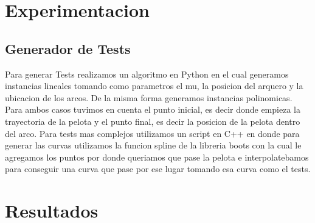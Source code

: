 \section{Experimentacion}
\subsection{Generador de Tests}
Para generar Tests realizamos un algoritmo en Python en el cual generamos instancias lineales tomando como parametros el mu, la posicion del arquero y la ubicacion de los arcos. De la misma forma generamos instancias polinomicas. Para ambos casos tuvimos en cuenta el punto inicial, es decir donde empieza la trayectoria de la pelota y el punto final, es decir la posicion de la pelota dentro del arco.
Para tests mas complejos utilizamos un script en C++ en donde para generar las curvas utilizamos la funcion spline de la libreria boots con la cual le agregamos los puntos por donde queriamos que pase la pelota e interpolatebamos para conseguir una curva que pase por ese lugar tomando esa curva como el tests.

\section{Resultados}